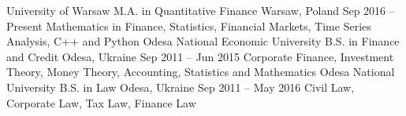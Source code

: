 \begin{cvsection}[Education]
  \cvexperience
    {University of Warsaw}
    {M.A. in Quantitative Finance}
    {Warsaw, Poland}
    {Sep 2016 – Present}
    {
      Mathematics in Finance, Statistics, Financial Markets, Time Series Analysis, C++ and Python
    }
  \cvexperience
    {Odesa National Economic University}
    {B.S. in Finance and Credit}
    {Odesa, Ukraine}
    {Sep 2011 – Jun 2015}
    {
      Corporate Finance, Investment Theory, Money Theory, Accounting, Statistics and Mathematics
    }
  \cvexperience
    {Odesa National University}
    {B.S. in Law}
    {Odesa, Ukraine}
    {Sep 2011 – May 2016}
    {
      Civil Law, Corporate Law, Tax Law, Finance Law
    }

\end{cvsection}
